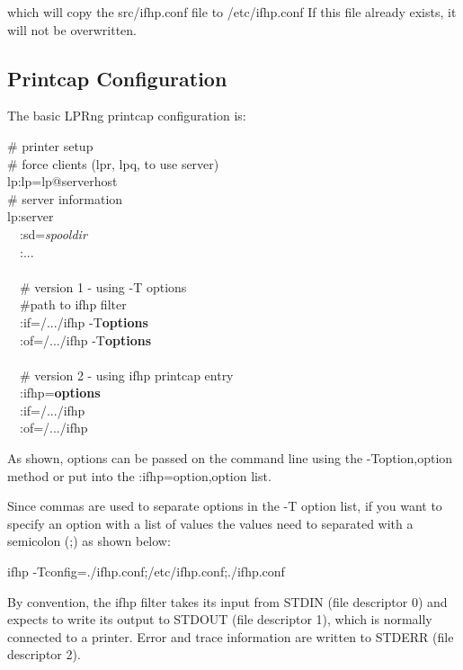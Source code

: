 \documentclass[a4paper]{article}
\begin{document}
which will copy the
{\ttfamily src/ifhp.conf}
file to
{\ttfamily /etc/ifhp.conf}
If this file already exists,
it will not be overwritten.


\subsection{Printcap Configuration}

The basic LPRng printcap configuration is:
\begin{tscreen}
\# printer setup  \\ 
\#  force clients (lpr, lpq, to use server)  \\ 
lp:lp=lp@serverhost  \\ 
\# server information  \\ 
lp:server  \\ 
~~:sd={\itshape spooldir\/}  \\ 
~~:...  \\ 
~~\\ 
~~\# version 1 - using -T options  \\ 
~~\#path to ifhp filter  \\ 
~~:if=/.../ifhp -T{\bfseries options}  \\ 
~~:of=/.../ifhp -T{\bfseries options}  \\ 
~~\\ 
~~\# version 2 - using ifhp printcap entry  \\ 
~~:ifhp={\bfseries options}  \\ 
~~:if=/.../ifhp  \\ 
~~:of=/.../ifhp  
\end{tscreen}


As shown,
options can be passed on the command line using the
{\ttfamily -Toption,option}
method or put into the
{\ttfamily :ifhp=option,option}
list.

Since commas are used to separate options in the
{\ttfamily -T}
option list,
if you want to specify an option with a list of values
the values need to separated with a semicolon
({\ttfamily ;})
as shown below:
\begin{tscreen}
ifhp -Tconfig=./ifhp.conf;/etc/ifhp.conf;./ifhp.conf
\end{tscreen}


By convention,
the
{\ttfamily ifhp}
filter takes its input from STDIN (file descriptor 0)
and expects to write its output to STDOUT (file descriptor 1),
which is normally connected to a printer.
Error and trace information are written to STDERR (file descriptor 2).
\end{document}
